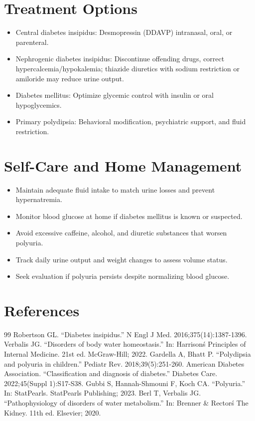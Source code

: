 \section*{Treatment Options}
\begin{itemize}
  \item Central diabetes insipidus: Desmopressin (DDAVP) intranasal, oral, or parenteral.
  \item Nephrogenic diabetes insipidus: Discontinue offending drugs, correct hypercalcemia/hypokalemia; thiazide diuretics with sodium restriction or amiloride may reduce urine output.
  \item Diabetes mellitus: Optimize glycemic control with insulin or oral hypoglycemics.
  \item Primary polydipsia: Behavioral modification, psychiatric support, and fluid restriction.
\end{itemize}

\section*{Self-Care and Home Management}
\begin{itemize}
  \item Maintain adequate fluid intake to match urine losses and prevent hypernatremia.
  \item Monitor blood glucose at home if diabetes mellitus is known or suspected.
  \item Avoid excessive caffeine, alcohol, and diuretic substances that worsen polyuria.
  \item Track daily urine output and weight changes to assess volume status.
  \item Seek evaluation if polyuria persists despite normalizing blood glucose.
\end{itemize}

\section*{References}
\begin{thebibliography}{99}
 Robertson GL. ``Diabetes insipidus.'' N Engl J Med. 2016;375(14):1387-1396.
 Verbalis JG. ``Disorders of body water homeostasis.'' In: Harrison\'s Principles of Internal Medicine. 21st ed. McGraw-Hill; 2022.
 Gardella A, Bhatt P. ``Polydipsia and polyuria in children.'' Pediatr Rev. 2018;39(5):251-260.
 American Diabetes Association. ``Classification and diagnosis of diabetes.'' Diabetes Care. 2022;45(Suppl 1):S17-S38.
 Gubbi S, Hannah-Shmouni F, Koch CA. ``Polyuria.'' In: StatPearls. StatPearls Publishing; 2023.
 Berl T, Verbalis JG. ``Pathophysiology of disorders of water metabolism.'' In: Brenner \& Rector\'s The Kidney. 11th ed. Elsevier; 2020.
\end{thebibliography}
